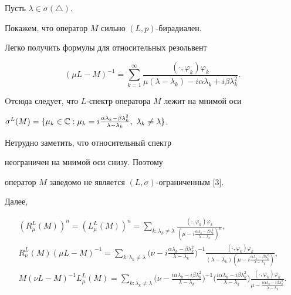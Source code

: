 Пусть $\lambda\in\sigma (\triangle )$.


Покажем, что оператор $M$ сильно $(L,p)$-бирадиален.


Легко получить формулы для относительных резольвент


$$


(\mu L-M)^{-1}=\sum_{k=1}^{\infty }\frac{(\cdot ,\varphi _k)\varphi_k}


{\mu (\lambda -\lambda _k)-i\alpha\lambda _k+i\beta\lambda _k^2}.


$$


Oтсюда следует, что $L$-спектр оператора $M$ лежит на мнимой оси


$\sigma^L(M)=\{\mu_k\in {\Bbb C}:\mu_k=i\frac{\alpha\lambda_k-


\beta\lambda_k^2}{\lambda -\lambda_k},\ \lambda_k\ne\lambda\}$.


Нетрудно заметить, что относительный спектр


неограничен на мнимой оси  снизу. Поэтому


оператор $M$ заведомо не является $(L,\sigma )$-ограниченным [3].


Далее,


\begin{gather*}


(R_{\mu }^L(M))^n=(L_{\mu }^L(M))^n=\sum\limits_{k:\lambda _k\ne\lambda }


\frac{(\cdot ,\varphi _k)\varphi _k}{\left (\mu -i\frac{\alpha\lambda _k-


\beta\lambda _k^2}{\lambda -\lambda _k}\right )^n},\\


%


R_{\nu }^L(M)(\mu L-M)^{-1}=


\sum_{k:\lambda _k\ne\lambda }


\bigg(\nu -i\frac{\alpha\lambda _k-\beta\lambda _k^2}{\lambda -\lambda _k}


\bigg)^{-1}\frac{(\cdot ,\varphi _k)\varphi _k}{(\lambda -\lambda _k)


\left (\mu -i\frac{


\alpha\lambda _k-\beta\lambda _k^2}{\lambda -\lambda _k}\right )},\\


%


M(\nu L-M)^{-1}L_{\mu }^L(M)=


\sum\limits_{k:\lambda _k\ne\lambda}


\bigg(


\nu -\frac{i\alpha\lambda _k-i\beta\lambda _k^2}{\lambda -\lambda _k}\bigg)


^{-1}\bigg(\frac


{i\alpha\lambda _k-i\beta\lambda _k^2}{\lambda -\lambda _k}\bigg)


\frac{(\cdot ,\varphi _k)\varphi _k}{\mu -\frac{i\alpha\lambda _k


-i\beta\lambda _k^2}{\lambda -\lambda _k}}.


\end{gather*}





